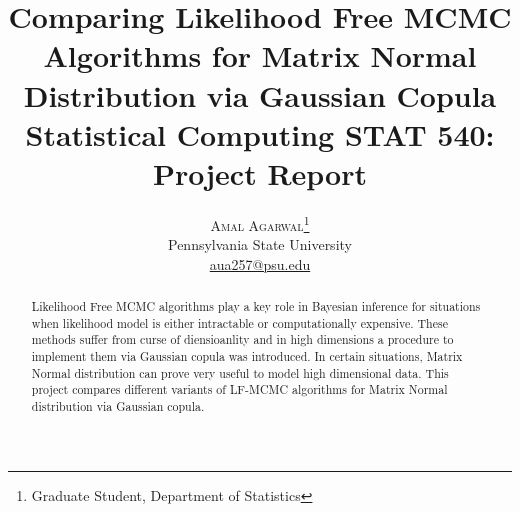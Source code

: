 
\title{\vspace{-15mm}\fontsize{16pt}{10pt}\selectfont\textbf{Comparing Likelihood Free MCMC Algorithms for Matrix Normal Distribution via Gaussian Copula\\}\vspace{0.08in}\fontsize{12pt}{5pt}\selectfont Statistical Computing STAT 540: Project Report} %

\author{
\large
\textsc{Amal Agarwal}\thanks{Graduate Student, Department of Statistics}\\[2mm] %
\normalsize Pennsylvania State University \\ %
\normalsize \href{mailto:aua257@psu.edu}{aua257@psu.edu} %
\vspace{-5mm}
}
\date{}




\maketitle %

\thispagestyle{fancy} %


\begin{abstract}
Likelihood Free MCMC algorithms play a key role in Bayesian inference for situations when likelihood model is either intractable or computationally expensive\cite{brooks2011handbook}. These methods suffer from curse of diensioanlity and in high dimensions a procedure to implement them via Gaussian copula was introduced\cite{li2015extending}.  In certain situations, Matrix Normal distribution can prove very useful to model high dimensional data\cite{yin2012model}. This project compares different variants of LF-MCMC algorithms for Matrix Normal distribution via Gaussian copula.
\end{abstract}

